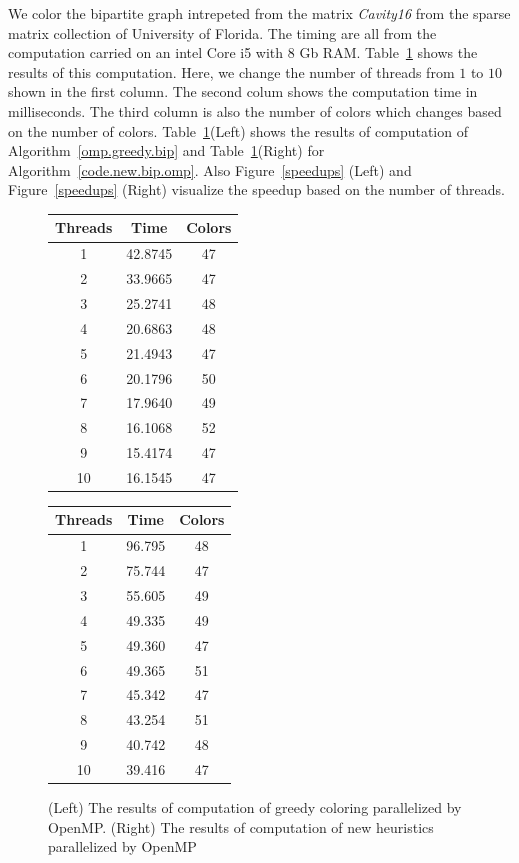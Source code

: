 \documentclass[12pt, oneside]{book}
\newcommand{\figref}[1]{Figure~\protect\ref{#1}}
\newcommand{\coderef}[1]{Algorithm~\protect\ref{#1}}
\begin{document}
We color the bipartite graph intrepeted from the matrix \textit{Cavity16}
from the sparse matrix collection of University of Florida.
The timing are all from the computation carried on an intel Core i5 with 8 Gb RAM.
Table~\ref{omp.res} shows the results of this computation.
Here, we change the number of threads from $1$ to $10$ shown in the first column. 
The second colum shows the computation time in milliseconds. The third column
is also the number of colors which changes based on the number of colors.
Table~\ref{omp.res}(Left) shows the results of computation of \coderef{omp.greedy.bip}
and Table~\ref{omp.res}(Right) for \coderef{code.new.bip.omp}.
Also \figref{speedups} (Left) and \figref{speedups} (Right) visualize the speedup
based on the number of threads.
\begin{figure}
\begin{tabular}{|c|c|c|}
\hline
Threads & Time & Colors \\\hline
1 & 42.8745 & 47 \\\hline
2 & 33.9665 & 47 \\\hline
3 & 25.2741 & 48 \\\hline
4 & 20.6863 & 48 \\\hline
5 & 21.4943 & 47 \\\hline
6 & 20.1796 & 50 \\\hline
7 & 17.9640 & 49 \\\hline
8 & 16.1068 & 52 \\\hline
9 & 15.4174 & 47 \\\hline
10 & 16.1545 & 47 \\\hline
\end{tabular}\hfill
\begin{tabular}{|c|c|c|}
\hline
Threads & Time & Colors \\\hline
1 & 96.795 & 48 \\\hline
2 & 75.744 & 47 \\\hline
3 & 55.605 & 49 \\\hline
4 & 49.335 & 49 \\\hline
5 & 49.360 & 47 \\\hline
6 & 49.365 & 51 \\\hline
7 & 45.342 & 47 \\\hline
8 & 43.254 & 51 \\\hline
9 & 40.742 & 48 \\\hline
10 & 39.416 & 47 \\\hline
\end{tabular}
\caption{
(Left) The results of computation of greedy coloring parallelized by OpenMP.
(Right) The results of computation of new heuristics parallelized by OpenMP}
\label{omp.res}
\end{figure}
\end{document}
